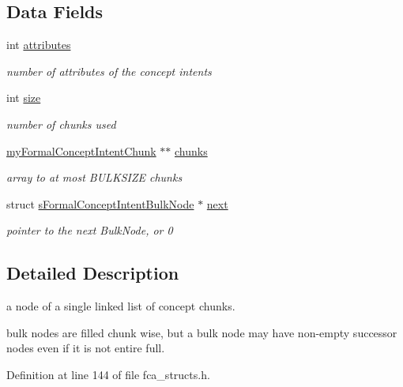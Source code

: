 \subsection*{\-Data \-Fields}
\begin{DoxyCompactItemize}
\item 
int \hyperlink{structsFormalConceptIntentBulkNode_a1fbfa6da3820560fef8549991a83e694}{attributes}
\begin{DoxyCompactList}\small\item\em number of attributes of the concept intents \end{DoxyCompactList}\item 
int \hyperlink{structsFormalConceptIntentBulkNode_afc96b660c7becf5517e4391846e0975f}{size}
\begin{DoxyCompactList}\small\item\em number of chunks used \end{DoxyCompactList}\item 
\hyperlink{fca__structs_8h_ae552e1b13988c8c4ca0ab8f8a3e60f96}{my\-Formal\-Concept\-Intent\-Chunk} $\ast$$\ast$ \hyperlink{structsFormalConceptIntentBulkNode_a581d8ff2f4deebf047730cfd5be1f754}{chunks}
\begin{DoxyCompactList}\small\item\em array to at most \-B\-U\-L\-K\-S\-I\-Z\-E chunks \end{DoxyCompactList}\item 
struct \*
\hyperlink{structsFormalConceptIntentBulkNode}{s\-Formal\-Concept\-Intent\-Bulk\-Node} $\ast$ \hyperlink{structsFormalConceptIntentBulkNode_a1cff65c57653d96d207878be8614b383}{next}
\begin{DoxyCompactList}\small\item\em pointer to the next \-Bulk\-Node, or 0 \end{DoxyCompactList}\end{DoxyCompactItemize}


\subsection{\-Detailed \-Description}
a node of a single linked list of concept chunks. 

bulk nodes are filled chunk wise, but a bulk node may have non-\/empty successor nodes even if it is not entire full. 

\-Definition at line 144 of file fca\-\_\-structs.\-h.



